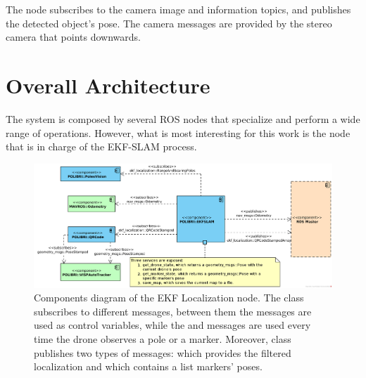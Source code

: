 The  node subscribes to the camera image and information topics, and publishes the detected object's pose. The camera messages are provided by the stereo camera that points downwards.

\section{Overall Architecture}
\label{sec:chapter2:arch}
The system is composed by several ROS nodes that specialize and perform a wide range of operations. However, what is most interesting for this work is the node that is in charge of the EKF-SLAM process. \\

\begin{figure}
    \centering
    \includegraphics[width=\textwidth]{Images/fig9-components_diagram}
    \caption[Components diagram of the EKF Localization node]{Components diagram of the EKF Localization node. The  class subscribes to different messages, between them the  messages are used as control variables, while the  and  messages are used every time the drone observes a pole or a marker. Moreover,  class publishes two types of messages:  which provides the filtered localization and  which contains a list markers' poses.}
    \label{fig:chapter2:architecture:components}
\end{figure}

